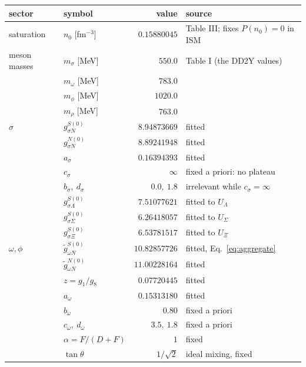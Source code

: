 \documentclass[aps,prc,onecolumn,superscriptaddress,nofootinbib,10pt]{revtex4-2}
\newcommand{\nzero}{n_0}
\begin{document}
\begin{table}[h]
\centering
\begin{tabular}{llrl}
\toprule
sector & symbol & value & source \\
\midrule
saturation & $\nzero$ [fm$^{-3}$] & $0.15880045$ & Table III; fixes $P(\nzero)=0$ in ISM \\
\midrule
meson masses & $m_\sigma$ [MeV] & $550.0$ & Table I (the DD2Y values) \\
             & $m_\omega$ [MeV] & $783.0$ & \\
             & $m_\phi$   [MeV] & $1020.0$ & \\
             & $m_\rho$   [MeV] & $763.0$ & \\
\midrule
$\sigma$ & $g^{S(0)}_{\sigma N}$ & $8.94873669$ & fitted \\
         & $g^{N(0)}_{\sigma N}$ & $8.89241948$ & fitted \\
         & $a_\sigma$            & $0.16394393$ & fitted \\
         & $c_\sigma$            & $\infty$     & fixed a priori: no plateau \\
         & $b_\sigma,\ d_\sigma$ & $0.0,\ 1.8$  & irrelevant while $c_\sigma=\infty$ \\
         & $g^{S(0)}_{\sigma\Lambda}$ & $7.51077621$ & fitted to $U_\Lambda$ \\
         & $g^{S(0)}_{\sigma\Sigma}$  & $6.26418057$ & fitted to $U_\Sigma$ \\
         & $g^{S(0)}_{\sigma\Xi}$     & $6.53781517$ & fitted to $U_\Xi$ \\
\midrule
$\omega,\phi$ & $\tilde{g}^{S(0)}_{\omega N}$ & $10.82857726$ & fitted, Eq.~\eqref{eq:aggregate} \\
              & $\tilde{g}^{N(0)}_{\omega N}$ & $11.00228164$ & fitted \\
              & $z = g_1/g_8$                 & $0.07720445$  & fitted \\
              & $a_\omega$                    & $0.15313180$  & fitted \\
              & $b_\omega$                    & $0.80$        & fixed a priori \\
              & $c_\omega,\ d_\omega$         & $3.5,\ 1.8$   & fixed a priori \\
              & $\alpha = F/(D+F)$            & $1$           & fixed \\
              & $\tan\theta$                  & $1/\sqrt{2}$  & ideal mixing, fixed \\

\end{tabular}
\end{table}
\end{document}
